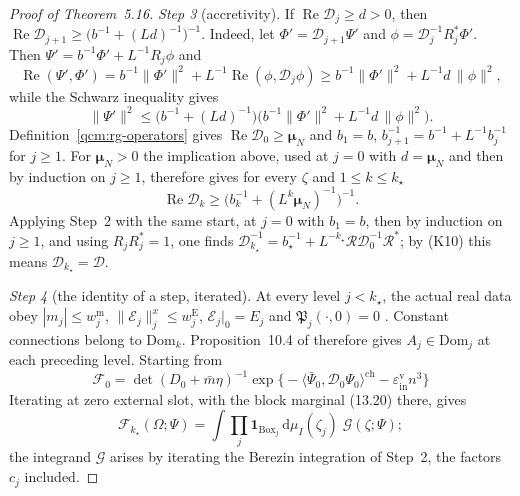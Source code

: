\documentclass[11pt,letterpaper,reqno]{amsart}
\theoremstyle{definition}
\begin{document}
\begin{proof}[Proof of Theorem~5.16]
\emph{Step 3} (accretivity).
If $\operatorname{Re}\mathcal D_j\ge d>0$, then $\operatorname{Re}\mathcal D_{j+1}\ge\bigl(b^{-1}+(Ld)^{-1}\bigr)^{-1}$.
Indeed, let $\Phi'=\mathcal D_{j+1}\Psi'$ and $\phi=\mathcal D_j^{-1}R_j^*\Phi'$.
Then $\Psi'=b^{-1}\Phi'+L^{-1}R_j\phi$ and
\begin{equation*}
\operatorname{Re}(\Psi',\Phi')=b^{-1}\|\Phi'\|^2+L^{-1}\operatorname{Re}(\phi,\mathcal D_j\phi)\ge b^{-1}\|\Phi'\|^2+L^{-1}d\,\|\phi\|^2,
\end{equation*}
while the Schwarz inequality gives
\begin{equation*}
\|\Psi'\|^2\le\bigl(b^{-1}+(Ld)^{-1}\bigr)\bigl(b^{-1}\|\Phi'\|^2+L^{-1}d\,\|\phi\|^2\bigr).
\end{equation*}
Definition~\ref{qcm:rg-operators} gives $\operatorname{Re}\mathcal D_0\ge\boldsymbol\mu_N$ and $b_1=b$, $b_{j+1}^{-1}=b^{-1}+L^{-1}b_j^{-1}$ for $j\ge1$.
For $\boldsymbol\mu_N>0$ the implication above, used at $j=0$ with $d=\boldsymbol\mu_N$ and then by induction on $j\ge1$, therefore gives for every $\zeta$ and $1\le k\le k_\star$
\begin{equation*}
\operatorname{Re}\mathcal D_k\ge\bigl(b_k^{-1}+(L^k\boldsymbol\mu_N)^{-1}\bigr)^{-1}.
\end{equation*}
Applying Step~2 with the same start, at $j=0$ with $b_1=b$, then by induction on $j\ge1$, and using $R_jR_j^*=1$, one finds $\mathcal D_{k_\star}^{-1}=\allowbreak b_\star^{-1}+L^{-k_\star}\mathcal R\mathcal D_0^{-1}\mathcal R^*$;
by (K10) this means $\mathcal D_{k_\star}=\mathcal D$.

\emph{Step 4} (the identity of a step, iterated).
At every level $j<k_\star$, the actual real data obey $|m_j|\le w^{\mathrm m}_j$, $\|\mathscr E_j\|^x_j\le w^{\mathrm E}_j$, $\mathscr E_j|_0=E_j$ and $\mathfrak P_j(\cdot,0)=0$ \cite[Proposition~16.2, Theorems~16.3--16.4]{QEDConstruction}.
Constant connections belong to $\mathrm{Dom}_k$. Proposition~10.4 of \cite{QEDConstruction} therefore gives $A_j\in\mathrm{Dom}_j$ at each preceding level.
Starting from
\begin{equation*}
\mathscr F_0=\det(D_0+\bar m\eta)^{-1}\exp\bigl\{-\langle\bar\Psi_0,\mathcal D_0\Psi_0\rangle^{\mathrm{ch}}-\varepsilon^{\mathrm v}_{\mathrm{in}}n^3\bigr\}
\end{equation*}
Iterating \cite[Theorem~14.8, equations~(14.47)--(14.48)]{QEDConstruction} at zero external slot, with the block marginal (13.20) there, gives
\begin{equation*}
\mathscr F_{k_\star}(\Omega;\Psi)=\int\prod_j\mathbf 1_{\mathrm{Box}_j}\,\mathrm d\mu_I(\zeta_j)\;\mathcal G(\zeta;\Psi);
\end{equation*}
the integrand $\mathcal G$ arises by iterating the Berezin integration of Step~2, the factors $c_j$ included.


\end{proof}
\end{document}
